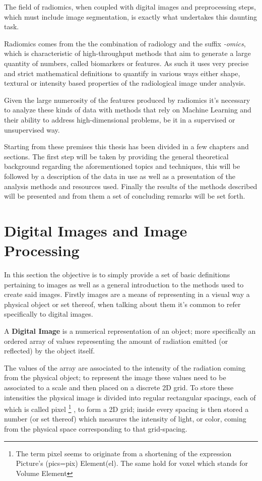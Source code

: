 The field of radiomics, when coupled with digital images and preprocessing steps, which must include image segmentation, is exactly what undertakes this daunting task.

Radiomics comes from the the combination of radiology and the suffix \textit{-omics}, which is characteristic of high-throughput methods that aim to generate a large quantity of numbers, called biomarkers or features. As such it uses very precise and strict mathematical definitions to quantify in various ways either shape, textural or intensity based properties of the radiological image under analysis.

Given the large numerosity of the features produced by radiomics it's necessary to analyze these kinds of data with methods that rely on Machine Learning and their ability to address high-dimensional problems, be it in a supervised or unsupervised way.

Starting from these premises this thesis has been divided in a few chapters and sections. The first step will be taken by providing the general theoretical background regarding the aforementioned topics and techniques, this will be followed by a description of the data in use as well as a presentation of the analysis methods and resources used. Finally the results of the methods described will be presented and from them a set of concluding remarks will be set forth.

\section{Digital Images and Image Processing}
In this section the objective is to simply provide a set of basic definitions pertaining to images as well as a general introduction to the methods used to create said images. Firstly images are a means of representing in a visual way a physical object or set thereof, when talking about them it's common to refer specifically to digital images.

A \textbf{Digital Image} is a numerical representation of an object; more specifically an ordered array of values representing the amount of radiation emitted (or reflected) by the object itself.

The values of the array are associated to the intensity of the radiation coming from the physical object; to represent the image these values need to be associated to a scale and then placed on a discrete 2D grid.
To store these intensities the physical image is divided into regular rectangular spacings, each of which is called pixel
\footnote{The term pixel seems to originate from a shortening of the expression Picture's (pics=pix) Element(el). The same hold for voxel which stands for Volume Element}
, to form a 2D grid; inside every spacing is then stored a number (or set thereof) which measures the intensity of light, or color, coming from the physical space corresponding to that grid-spacing.

